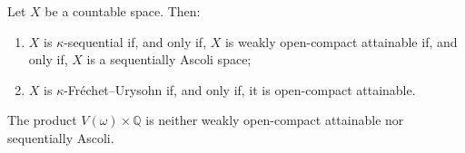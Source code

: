 \documentclass[10pt,a4paper]{amsart}
\newcommand{\w}{\omega}
\begin{document}
\begin{corollary} \label{c:counable-X-woca-Seq-Ascoli}
Let $X$ be a countable space. Then:
\begin{enumerate}
\item[{\rm(i)}] $X$ is $\kappa$-sequential if, and only if, $X$ is weakly open-compact attainable if, and only if,  $X$ is a sequentially Ascoli space;
\item[{\rm(ii)}] $X$ is $\kappa$-Fr\'{e}chet--Urysohn if, and only if, it is open-compact attainable.
\end{enumerate}
\end{corollary}

\begin{example} \label{exa:Veer-Q}
The product $V(\w)\times \mathbb{Q}$ is neither weakly open-compact attainable nor sequentially Ascoli.
\end{example}
\end{document}
